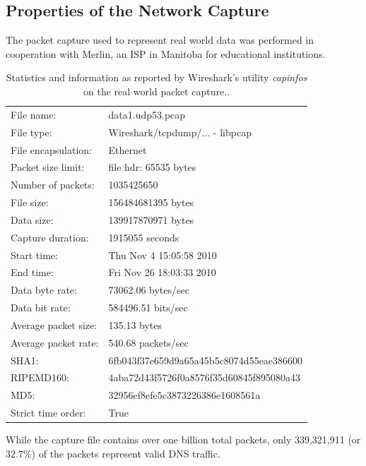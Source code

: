 \documentclass[12pt]{report}
\theoremstyle{remark}
\theoremstyle{definition}
\theoremstyle{definition}
\theoremstyle{definition}
\begin{document}
\begin{appendices}
\chapter{Properties of the Network Capture}
\label{appendix-capturestats}

The packet capture used to represent real world data was performed in cooperation with Merlin, an ISP in Manitoba for educational institutions.

\begin{table}[h]
\centering
\begin{tabular}{ l l }
File name:           &data1.udp53.pcap\\
File type:           &Wireshark/tcpdump/... - libpcap\\
File encapsulation:  &Ethernet\\
Packet size limit:   &file hdr: 65535 bytes\\
Number of packets:   &1035425650\\
File size:           &156484681395 bytes\\
Data size:           &139917870971 bytes\\
Capture duration:    &1915055 seconds\\
Start time:          &Thu Nov  4 15:05:58 2010\\
End time:            &Fri Nov 26 18:03:33 2010\\
Data byte rate:      &73062.06 bytes/sec\\
Data bit rate:       &584496.51 bits/sec\\
Average packet size: &135.13 bytes\\
Average packet rate: &540.68 packets/sec\\
SHA1:                &6fb043f37e659d9a65a45b5c8074d55eae386600\\
RIPEMD160:           &4aba72d43f5726f0a8576f35d60845f895080a43\\
MD5:                 &32956ef8efe5c3873226386e1608561a\\
Strict time order:   &True\\
\end{tabular}
\caption[Packet Capture Statistics from \emph{capinfos}]{Statistics and information as reported by Wireshark's utility \emph{capinfos} on the real world packet capture..}
\label{TABLE_capinfos}
\end{table}

While the capture file contains over one billion total packets, only 339,321,911 (or $32.7\%$) of the packets represent valid DNS traffic.


\end{appendices}
\end{document}
